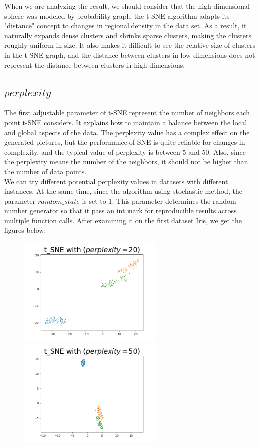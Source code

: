 \noindent When we are analyzing the result, we should consider that the high-dimensional sphere was modeled by probability graph, the t-SNE algorithm adapts its "distance" concept to changes in regional density in the data set. As a result, it naturally expands dense clusters and shrinks sparse clusters, making the clusters roughly uniform in size. It also makes it difficult to see the relative size of clusters in the t-SNE graph, and the distance between clusters in low dimensions does not represent the distance between clusters in high dimensions.

\subsection{$perplexity$}

\noindent The first adjustable parameter of t-SNE represent the number of neighbors each point t-SNE considers. It explains how to maintain a balance between the local and global aspects of the data. The perplexity value has a complex effect on the generated pictures, but the performance of SNE is quite reliable for changes in complexity, and the typical value of perplexity is between 5 and 50\cite{ref9}. Also, since the perplexity means the number of the neighbors, it should not be higher than the number of data points.\\

\noindent We can try different potential perplexity values in datasets with different instances. At the same time, since the algorithm using stochastic method, the parameter $random\_state$ is set to 1. This parameter determines the random number generator so that it pass an int mark for reproducible results across multiple function calls. After examining it on the first dataset Iris, we get the figures below:

\begin{figure}[H]
\centering  %
{
\label{Fig.sub.1}
\includegraphics[width=7cm,height=3.5cm\textwidth]{images/image_comparison_tsne_perp20.png}}
{
\label{Fig.sub.2}
\includegraphics[width=7cm,height=3.5cm\textwidth]{images/image_comparison_tsne_perp50.png}}
\end{figure}

